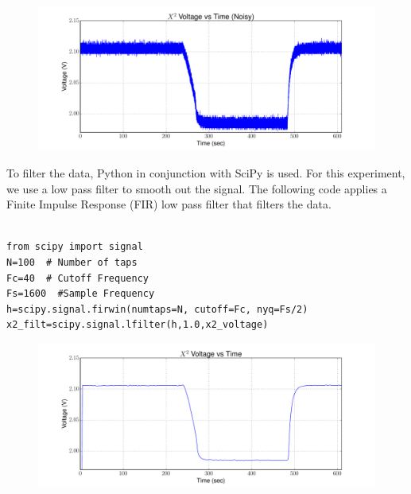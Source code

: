 \begin{figure}[h!tb] \centering
\includegraphics[width=\textwidth]{Experiments/Exp1/noisy_voltage.pdf}
\label{X2_Raw}
\end{figure}

To filter the data, Python in conjunction with SciPy is used.  For this experiment, we use a low pass filter to smooth out the signal.  The following code applies a Finite Impulse Response (FIR) low pass filter that filters the data.
\ \\ \ \\
\begin{minipage}{\linewidth}
\begin{lstlisting}[frame=single,keywordstyle=\color{blue}]
from scipy import signal
N=100  # Number of taps
Fc=40  # Cutoff Frequency
Fs=1600  #Sample Frequency
h=scipy.signal.firwin(numtaps=N, cutoff=Fc, nyq=Fs/2)
x2_filt=scipy.signal.lfilter(h,1.0,x2_voltage)
\end{lstlisting}
\end{minipage}

\begin{figure}[h!tb] \centering
\includegraphics[width=\textwidth]{Experiments/Exp1/x2_filter.pdf}
\label{X2_filter}
\end{figure}


